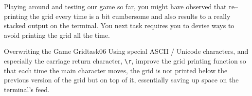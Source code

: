 \documentclass[a4paper, 11pt]{article}
\numberwithin{equation}{section}
\theoremstyle{definition}
\begin{document}
	Playing around and testing our game so far, you might have observed that re--printing the grid every time is a bit cumbersome and also results to a really stacked output on the terminal. You next task requires you to devise ways to avoid printing the grid all the time.
	
	\begin{task}{Overwriting the Game Grid}{task06}
		Using special ASCII / Unicode characters, and especially the carriage return character, \texttt{\textbackslash r}, improve the grid printing function so that each time the main character moves, the grid is not printed below the previous version of the grid but on top of it, essentially saving up space on the terminal's feed.
	\end{task}
\end{document}
